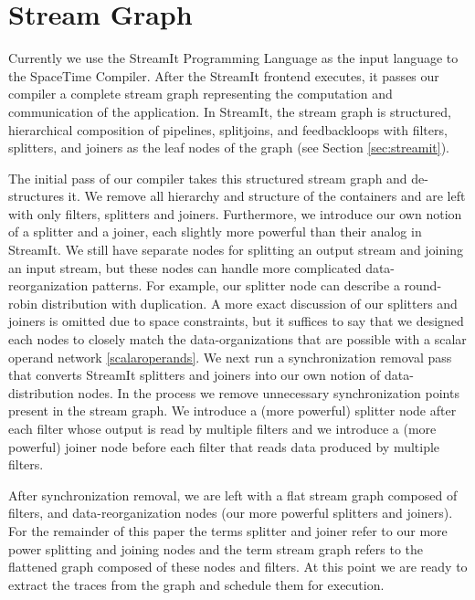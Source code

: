 \section{Stream Graph}
Currently we use the StreamIt Programming Language as the input
language to the SpaceTime Compiler. After the StreamIt frontend
executes, it passes our compiler a complete stream graph representing
the computation and communication of the application.  In StreamIt,
the stream graph is structured, hierarchical composition of pipelines,
splitjoins, and feedbackloops with filters, splitters, and joiners as
the leaf nodes of the graph (see Section \ref{sec:streamit}).

The initial pass of our compiler takes this structured stream graph
and de-structures it.  We remove all hierarchy and structure of the
containers and are left with only filters, splitters and joiners.
Furthermore, we introduce our own notion of a splitter and a joiner,
each slightly more powerful than their analog in StreamIt.  We still
have separate nodes for splitting an output stream and joining an
input stream, but these nodes can handle more complicated
data-reorganization patterns.  For example, our splitter node can
describe a round-robin distribution with duplication.  A more exact
discussion of our splitters and joiners is omitted due to space
constraints, but it suffices to say that we designed each nodes to
closely match the data-organizations that are possible with a scalar
operand network \ref{scalaroperands}.  We next run a synchronization
removal pass that converts StreamIt splitters and joiners into our own
notion of data-distribution nodes.  In the process we remove
unnecessary synchronization points present in the stream graph.  We
introduce a (more powerful) splitter node after each filter whose
output is read by multiple filters and we introduce a (more powerful)
joiner node before each filter that reads data produced by multiple
filters.

After synchronization removal, we are left with a flat stream graph
composed of filters, and data-reorganization nodes (our more powerful
splitters and joiners).  For the remainder of this paper the terms
splitter and joiner refer to our more power splitting and joining
nodes and the term stream graph refers to the flattened graph composed
of these nodes and filters.  At this point we are ready to extract the
traces from the graph and schedule them for execution. 


